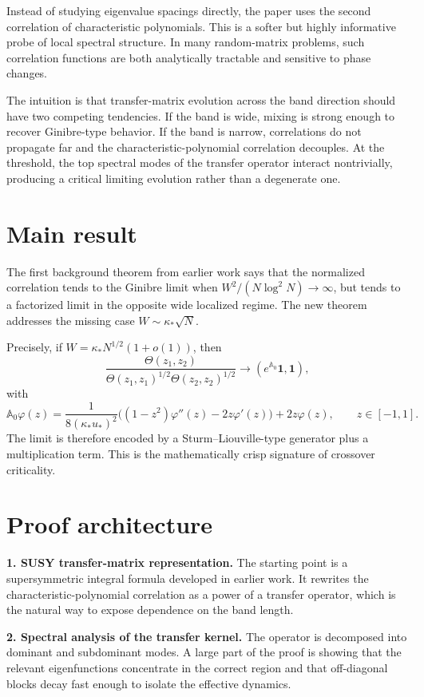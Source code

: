\documentclass[11pt]{article}
\begin{document}
Instead of studying eigenvalue spacings directly, the paper uses the second correlation of characteristic polynomials. This is a softer but highly informative probe of local spectral structure. In many random-matrix problems, such correlation functions are both analytically tractable and sensitive to phase changes.

The intuition is that transfer-matrix evolution across the band direction should have two competing tendencies. If the band is wide, mixing is strong enough to recover Ginibre-type behavior. If the band is narrow, correlations do not propagate far and the characteristic-polynomial correlation decouples. At the threshold, the top spectral modes of the transfer operator interact nontrivially, producing a critical limiting evolution rather than a degenerate one.

\section*{Main result}
The first background theorem from earlier work says that the normalized correlation tends to the Ginibre limit when $W^2/(N\log^2 N)\to\infty$, but tends to a factorized limit in the opposite wide localized regime. The new theorem addresses the missing case $W\sim\kappa_*\sqrt N$.

Precisely, if $W=\kappa_*N^{1/2}(1+o(1))$, then
\[
\frac{\Theta(z_1,z_2)}{\Theta(z_1,z_1)^{1/2}\Theta(z_2,z_2)^{1/2}}
\longrightarrow (e^{\mathbb A_0}\mathbf 1,\mathbf 1),
\]
with
\[
\mathbb A_0\varphi(z)=\frac{1}{8(\kappa_*u_*)^2}\Big((1-z^2)\varphi''(z)-2z\varphi'(z)\Big)+2z\varphi(z),\qquad z\in[-1,1].
\]
The limit is therefore encoded by a Sturm--Liouville-type generator plus a multiplication term. This is the mathematically crisp signature of crossover criticality.

\section*{Proof architecture}
\textbf{1. SUSY transfer-matrix representation.} The starting point is a supersymmetric integral formula developed in earlier work. It rewrites the characteristic-polynomial correlation as a power of a transfer operator, which is the natural way to expose dependence on the band length.

\textbf{2. Spectral analysis of the transfer kernel.} The operator is decomposed into dominant and subdominant modes. A large part of the proof is showing that the relevant eigenfunctions concentrate in the correct region and that off-diagonal blocks decay fast enough to isolate the effective dynamics.
\end{document}

